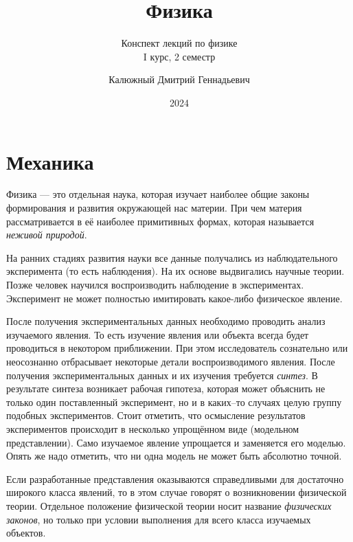 \documentclass[10pt]{scrbook}
\begin{document}
\frontmatter

\title{Физика}
\subtitle{Конспект лекций по физике\\I курс, 2 семестр}
\author{
	Калюжный Дмитрий Геннадьевич
}
\date{2024}

\maketitle

\tableofcontents
\newpage

\mainmatter

\part{Механика}

Физика --- это отдельная наука, которая изучает наиболее общие законы
формирования и развития окружающей нас материи. При чем материя рассматривается
в её наиболее примитивных формах, которая называется \emph{неживой природой}.

На ранних стадиях развития науки все данные получались из наблюдательного
эксперимента (то есть наблюдения). На их основе выдвигались научные теории.
Позже человек научился воспроизводить наблюдение в экспериментах. Эксперимент
не может полностью имитировать какое-либо физическое явление.

После получения экспериментальных данных необходимо проводить анализ изучаемого
явления. То есть изучение явления или объекта всегда будет проводиться в
некотором приближении. При этом исследователь сознательно или неосознанно
отбрасывает некоторые детали воспроизводимого явления. После получения
экспериментальных данных и их изучения требуется \emph{синтез}. В результате
синтеза возникает рабочая гипотеза, которая может объяснить не только один
поставленный эксперимент, но и в каких--то случаях целую группу подобных
экспериментов. Стоит отметить, что осмысление результатов экспериментов
происходит в несколько упрощённом виде (модельном представлении). Само
изучаемое явление упрощается и заменяется его моделью. Опять же надо отметить,
что ни одна модель не может быть абсолютно точной.

Если разработанные представления оказываются справедливыми для достаточно
широкого класса явлений, то в этом случае говорят о возникновении физической
теории. Отдельное положение физической теории носит название \emph{физических
	законов}, но только при условии выполнения для всего класса изучаемых объектов.
\end{document}
